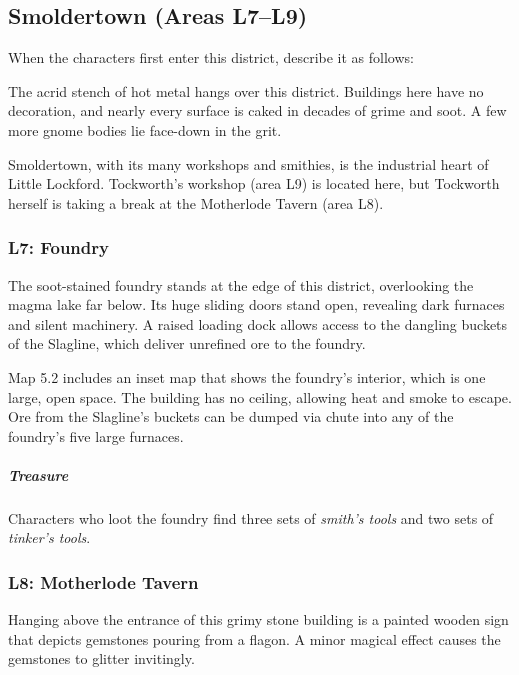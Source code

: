 \documentclass[10pt,a4paper,twoside,bg=print,twocolumn,openany,nodeprecatedcode]{dndbook}
\begin{document}
\subsection{Smoldertown (Areas L7–L9)}
When the characters first enter this district, describe it as follows:

\begin{DndReadAloud}{}
The acrid stench of hot metal hangs over this district. Buildings here have no decoration, and nearly every surface is caked in decades of grime and soot. A few more gnome bodies lie face-down in the grit.

\end{DndReadAloud}

Smoldertown, with its many workshops and smithies, is the industrial heart of Little Lockford. Tockworth's workshop (area L9) is located here, but Tockworth herself is taking a break at the Motherlode Tavern (area L8).

\subsubsection{L7: Foundry}
\begin{DndReadAloud}{}
The soot-stained foundry stands at the edge of this district, overlooking the magma lake far below. Its huge sliding doors stand open, revealing dark furnaces and silent machinery. A raised loading dock allows access to the dangling buckets of the Slagline, which deliver unrefined ore to the foundry.

\end{DndReadAloud}

Map 5.2 includes an inset map that shows the foundry's interior, which is one large, open space. The building has no ceiling, allowing heat and smoke to escape. Ore from the Slagline's buckets can be dumped via chute into any of the foundry's five large furnaces.

\subparagraph{Treasure}
Characters who loot the foundry find three sets of \textit{smith's tools} and two sets of \textit{tinker's tools}.

\subsubsection{L8: Motherlode Tavern}
\begin{DndReadAloud}{}
Hanging above the entrance of this grimy stone building is a painted wooden sign that depicts gemstones pouring from a flagon. A minor magical effect causes the gemstones to glitter invitingly.

\end{DndReadAloud}
\end{document}
